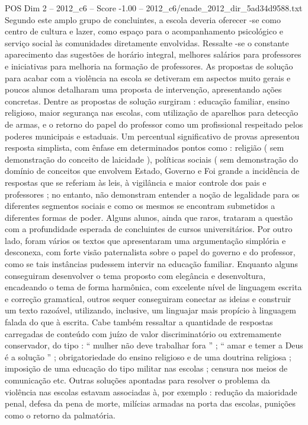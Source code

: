 \begin{textsample}{POS Dim 2 – 2012\_c6 – Score -1.00 – 2012\_c6/enade\_2012\_dir\_5ad34d9588.txt}
Segundo este amplo grupo de concluintes, a escola deveria oferecer -se como centro de cultura e lazer, como espaço para o acompanhamento psicológico e serviço social às comunidades diretamente envolvidas.
Ressalte -se o constante aparecimento das sugestões de horário integral, melhores salários para professores e iniciativas para melhoria na formação de professores.
As propostas de solução para acabar com a violência na escola se detiveram em aspectos muito gerais e poucos alunos detalharam uma proposta de intervenção, apresentando ações concretas.
Dentre as propostas de solução surgiram : educação familiar, ensino religioso, maior segurança nas escolas, com utilização de aparelhos para detecção de armas, e o retorno do papel do professor como um profissional respeitado pelos poderes municipais e estaduais.
Um percentual significativo de provas apresentou resposta simplista, com ênfase em determinados pontos como : religião ( sem demonstração do conceito de laicidade ), políticas sociais ( sem demonstração do domínio de conceitos que envolvem Estado, Governo e Foi grande a incidência de respostas que se referiam às leis, à vigilância e maior controle dos pais e professores ; no entanto, não demonstram entender a noção de legalidade para os diferentes segmentos sociais e como os mesmos se encontram submetidos a diferentes formas de poder.
Alguns alunos, ainda que raros, trataram a questão com a profundidade esperada de concluintes de cursos universitários.
Por outro lado, foram vários os textos que apresentaram uma argumentação simplória e desconexa, com forte visão paternalista sobre o papel do governo e do professor, como se tais instâncias pudessem intervir na educação familiar.
Enquanto alguns conseguiram desenvolver o tema proposto com elegância e desenvoltura, encadeando o tema de forma harmônica, com excelente nível de linguagem escrita e correção gramatical, outros sequer conseguiram conectar as ideias e construir um texto razoável, utilizando, inclusive, um linguajar mais propício à linguagem falada do que à escrita.
Cabe também ressaltar a quantidade de respostas carregadas de conteúdo com juízo de valor discriminatório ou extremamente conservador, do tipo : “ mulher não deve trabalhar fora ” ; “ amar e temer a Deus é a solução ” ; obrigatoriedade do ensino religioso e de uma doutrina religiosa ; imposição de uma educação do tipo militar nas escolas ; censura nos meios de comunicação etc.
Outras soluções apontadas para resolver o problema da violência nas escolas estavam associadas à, por exemplo : redução da maioridade penal, defesa da pena de morte, milícias armadas na porta das escolas, punições como o retorno da palmatória.

\end{textsample}
